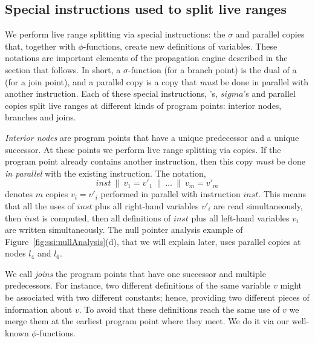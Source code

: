 \subsection{Special instructions used to split live ranges}
\label{sub:split}

We perform live range splitting via special instructions: the $\sigma$ and parallel copies that, together with $\phi$-functions, create new definitions of variables.
These notations are important elements of the propagation engine described in the section that follows.
In short, a $\sigma$-function (for a branch point) is the dual of a \phiop (for a join point), and a parallel copy is a copy that \emph{must} be done in parallel with another instruction.
Each of these special instructions, \phiop's, $sigma$'s and parallel copies split live ranges at different kinds of program points: interior nodes, branches and joins.

{\em Interior nodes} are program points that have a unique predecessor and a unique successor.
At these points we perform live range splitting via copies.
If the program point already contains another instruction, then this copy \emph{must} be done \emph{in parallel} with the existing instruction.
The notation, \[inst \ \parallel\  v_1=v'_1 \ \parallel\  \dots \ \parallel\  v_m=v'_m\] denotes $m$ copies $v_i=v'_i$ performed in parallel with
instruction $inst$.
This means that all the uses of $inst$ plus all right-hand variables $v'_i$ are read simultaneously, then $inst$ is computed, then all definitions of $inst$ plus all left-hand variables $v_i$ are written simultaneously.
The null pointer analysis example of Figure~\ref{fig:ssi:nullAnalysis}(d), that we will explain later, uses parallel copies at nodes $l_4$ and $l_6$.


We call {\em joins} the program points that have one successor and multiple predecessors.
For instance, two different definitions of the same variable $v$ might be associated with two different constants; hence, providing two different pieces of information about $v$.
To avoid that these definitions reach the same use of $v$ we merge them at the earliest program point where they meet.
We do it via our well-known $\phi$-functions.

